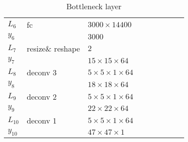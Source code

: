 \begin{table}[h!]
{\begin{tabular}{|lllllllll|}
			\multicolumn{1}{|l|}{$L_6$}   & fc               & \multicolumn{1}{l|}{$3000\times 14400$}          &                & \multicolumn{1}{l|}{}                      \\
			\multicolumn{1}{|l|}{$y_6$}   &                  & \multicolumn{1}{l|}{$3000$}                      &                & \multicolumn{1}{l|}{}                      \\ \hline

			\multicolumn{1}{|l|}{$L_7$}   & resize\& reshape & \multicolumn{1}{l|}{$2$}                         &                & \multicolumn{1}{l|}{}                      \\
			\multicolumn{1}{|l|}{$y_7$}   &                  & \multicolumn{1}{l|}{$15\times15\times 64$}       &                & \multicolumn{1}{l|}{}                      \\ \hline

			\multicolumn{1}{|l|}{$L_8$}   & deconv 3         & \multicolumn{1}{l|}{$5\times 5\times1\times 64$} &                & \multicolumn{1}{l|}{}                      \\
			\multicolumn{1}{|l|}{$y_8$}   &                  & \multicolumn{1}{l|}{$18\times18\times64$}        &                & \multicolumn{1}{l|}{}                      \\ \hline

			\multicolumn{1}{|l|}{$L_9$}   & deconv 2         & \multicolumn{1}{l|}{$5\times 5\times1\times 64$} &                & \multicolumn{1}{l|}{}                      \\
			\multicolumn{1}{|l|}{$y_9$}   &                  & \multicolumn{1}{l|}{$22\times22\times64$}        &                & \multicolumn{1}{l|}{}                      \\ \hline


			\multicolumn{1}{|l|}{$L_{10}$}   & deconv 1         & \multicolumn{1}{l|}{$5\times 5\times1\times 64$} &                & \multicolumn{1}{l|}{}                      \\
			\multicolumn{1}{|l|}{$y_{10}$}   &                  & \multicolumn{1}{l|}{$47\times47\times1$}         &                & \multicolumn{1}{l|}{}                      \\ \hline
		\end{tabular}
		\caption{ \newline *Bottleneck layer} \label{tab:netIV}
	}
\end{table}
